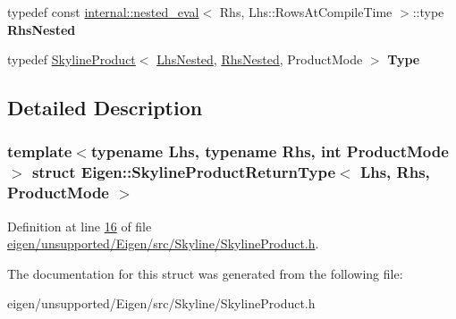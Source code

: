 \begin{DoxyCompactItemize}
typedef const \hyperlink{struct_eigen_1_1internal_1_1nested__eval}{internal\+::nested\+\_\+eval}$<$ Rhs, Lhs\+::\+Rows\+At\+Compile\+Time $>$\+::type {\bfseries Rhs\+Nested}
\item 
\mbox{\label{struct_eigen_1_1_skyline_product_return_type_a09b96c5c616f93dde2a8d7e1b61599ad}} 
typedef \hyperlink{class_eigen_1_1_skyline_product}{Skyline\+Product}$<$ \hyperlink{class_eigen_1_1internal_1_1_tensor_lazy_evaluator_writable}{Lhs\+Nested}, \hyperlink{class_eigen_1_1internal_1_1_tensor_lazy_evaluator_writable}{Rhs\+Nested}, Product\+Mode $>$ {\bfseries Type}
\end{DoxyCompactItemize}


\subsection{Detailed Description}
\subsubsection*{template$<$typename Lhs, typename Rhs, int Product\+Mode$>$\newline
struct Eigen\+::\+Skyline\+Product\+Return\+Type$<$ Lhs, Rhs, Product\+Mode $>$}



Definition at line \hyperlink{eigen_2unsupported_2_eigen_2src_2_skyline_2_skyline_product_8h_source_l00016}{16} of file \hyperlink{eigen_2unsupported_2_eigen_2src_2_skyline_2_skyline_product_8h_source}{eigen/unsupported/\+Eigen/src/\+Skyline/\+Skyline\+Product.\+h}.



The documentation for this struct was generated from the following file\+:\begin{DoxyCompactItemize}
\item 
eigen/unsupported/\+Eigen/src/\+Skyline/\+Skyline\+Product.\+h\end{DoxyCompactItemize}
